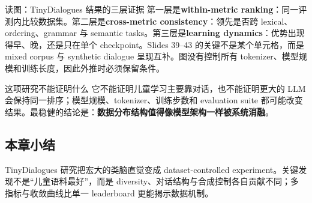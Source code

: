 




\begin{knowledgebox}{读图：TinyDialogues 结果的三层证据}
第一层是\textbf{within-metric ranking}：同一评测内比较数据集。第二层是\textbf{cross-metric consistency}：领先是否跨 lexical、ordering、grammar 与 semantic tasks。第三层是\textbf{learning dynamics}：优势出现得早、晚，还是只在单个 checkpoint。Slides 39--43 的关键不是某个单元格，而是 mixed corpus 与 synthetic dialogue 呈现互补。图没有控制所有 tokenizer、模型规模和训练长度，因此外推时必须保留条件。
\end{knowledgebox}

\begin{warningbox}{这项研究不能证明什么}
它不能证明儿童学习主要靠对话，也不能证明更大的 LLM 会保持同一排序；模型规模、tokenizer、训练步数和 evaluation suite 都可能改变结果。最稳健的结论是：\textbf{数据分布结构值得像模型架构一样被系统消融}。
\end{warningbox}

\subsection{本章小结}

TinyDialogues 研究把宏大的类脑直觉变成 dataset-controlled experiment。关键发现不是“儿童语料最好”，而是 diversity、对话结构与合成控制各自贡献不同；多指标与收敛曲线比单一 leaderboard 更能揭示数据机制。

